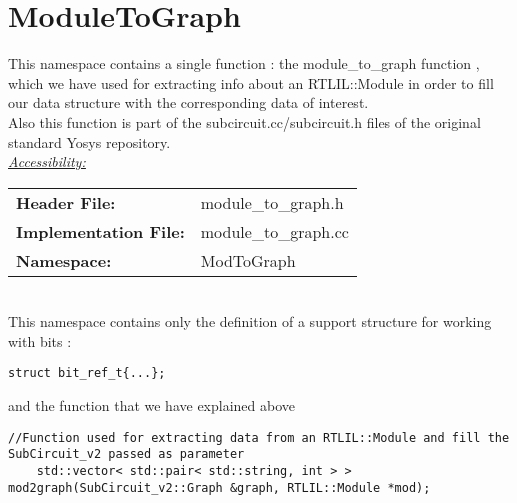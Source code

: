 \documentclass{article}
\newcommand{\sectionbreak}{\clearpage}
\begin{document}
\sectionbreak{\clearpage}


\section{ModuleToGraph}

This namespace contains a single function : the module\_to\_graph function , which we have used for extracting info about an RTLIL::Module in order to fill our data structure with the corresponding data of interest.\\

Also this function is part of the subcircuit.cc/subcircuit.h files of the original standard Yosys repository.\\

\underline{\textit{\underline{Accessibility: }}}\\

\begin{tabular}{ll}
	\textbf{Header File:} & module\_to\_graph.h\\
	\textbf{Implementation File:} & module\_to\_graph.cc\\
	\textbf{Namespace: } & ModToGraph\\
\end{tabular}\\

This namespace contains only the definition of a support structure for working with bits :\\

\begin{mdframed}[hidealllines=true, backgroundcolor=gray!10]
	\begin{lstlisting}[basicstyle=\tiny]
	struct bit_ref_t{...};
	\end{lstlisting}
\end{mdframed}

and the function that we have explained above

\sectionbreak{\clearpage}

\begin{mdframed}[hidealllines=true, backgroundcolor=gray!10]
	\begin{lstlisting}[basicstyle=\tiny]
	//Function used for extracting data from an RTLIL::Module and fill the SubCircuit_v2 passed as parameter
	std::vector< std::pair< std::string, int > > mod2graph(SubCircuit_v2::Graph &graph, RTLIL::Module *mod);
	\end{lstlisting}
\end{mdframed}
\end{document}
